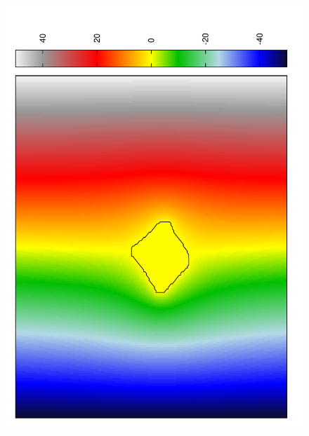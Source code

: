 \documentclass{beamer}
\begin{document}
\begin{frame}
    \begin{figure}
        \includegraphics[angle=-90,width=\textwidth]{bmp.pdf}
    \end{figure}
\end{frame}
\end{document}
